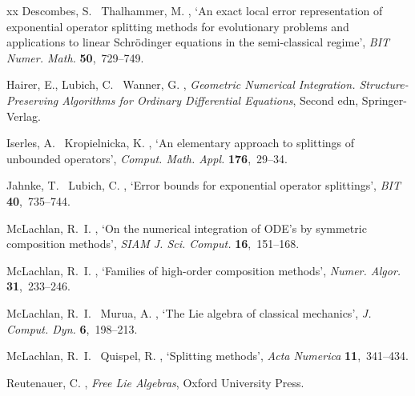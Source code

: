 \documentclass[11pt]{article}
\begin{document}
\begin{thebibliography}{xx}
Descombes, S. \harvardand\ Thalhammer, M.  \harvardyearright , `An exact local error representation of exponential
  operator splitting methods for evolutionary problems and applications to
  linear {S}chr\"odinger equations in the semi-classical regime', {\em BIT
  Numer. Math.} {\bf 50},~729--749.

Hairer, E., Lubich, C. \harvardand\ Wanner, G.  \harvardyearleft
  2006\harvardyearright , {\em Geometric {N}umerical {I}ntegration.
  {S}tructure-{P}reserving {A}lgorithms for {O}rdinary {D}ifferential
  {E}quations}, {S}econd edn, Springer-Verlag.

Iserles, A. \harvardand\ Kropielnicka, K.  \harvardyearright , `An elementary approach to splittings of unbounded
  operators', {\em Comput. Math. Appl.} {\bf 176},~29--34.

Jahnke, T. \harvardand\ Lubich, C.  \harvardyearright ,
  `Error bounds for exponential operator splittings', {\em BIT} {\bf
  40},~735--744.

McLachlan, R.~I.  \harvardyearright , `On the numerical
  integration of {ODE}'s by symmetric composition methods', {\em SIAM J. Sci.
  Comput.} {\bf 16},~151--168.

McLachlan, R.~I.  \harvardyearright , `Families of
  high-order composition methods', {\em Numer. Algor.} {\bf 31},~233--246.

McLachlan, R.~I. \harvardand\ Murua, A.  \harvardyearleft 2019\harvardyearright
  , `The {L}ie algebra of classical mechanics', {\em J. Comput. Dyn.} {\bf
  6},~198--213.

McLachlan, R.~I. \harvardand\ Quispel, R.  \harvardyearright , `Splitting methods', {\em Acta Numerica} {\bf
  11},~341--434.

Reutenauer, C.  \harvardyearright , {\em Free {L}ie
  {A}lgebras}, Oxford University Press.


\end{thebibliography}
\end{document}
